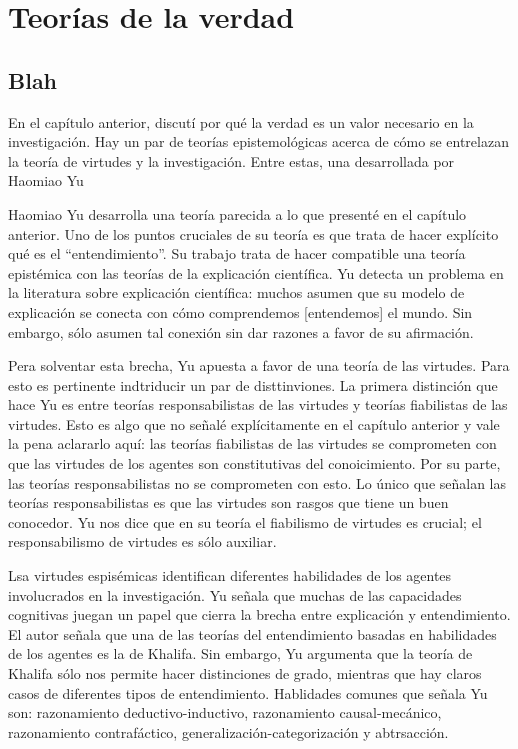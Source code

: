 

\chapter{Teorías de la verdad}
\label{ch:truththeories}

\section{Blah}

En el capítulo anterior, discutí por qué la verdad es un valor necesario en la investigación. Hay un par de teorías epistemológicas acerca de cómo se entrelazan la teoría de virtudes y la investigación. Entre estas, una desarrollada por Haomiao Yu %

Haomiao Yu desarrolla una teoría parecida a lo que presenté en el capítulo anterior. Uno de los puntos cruciales de su teoría es que trata de hacer explícito qué es el ``entendimiento''. Su trabajo trata de hacer compatible una teoría epistémica con las teorías de la explicación científica. Yu detecta un problema en la literatura sobre explicación científica: muchos asumen que su modelo de explicación se conecta con cómo comprendemos [entendemos] el mundo. Sin embargo, sólo asumen tal conexión sin dar razones a favor de su afirmación.

Pera solventar esta brecha, Yu apuesta a favor de una teoría de las virtudes. Para esto es pertinente indtriducir un par de disttinviones. La primera distinción que hace Yu es entre teorías responsabilistas de las virtudes y teorías fiabilistas de las virtudes. Esto es algo que no señalé explícitamente en el capítulo anterior y vale la pena aclararlo aquí: las teorías fiabilistas de las virtudes se comprometen con que las virtudes de los agentes son constitutivas del conoicimiento. Por su parte, las teorías responsabilistas no se comprometen con esto. Lo único que señalan las teorías responsabilistas es que las virtudes son rasgos que tiene un buen conocedor. Yu nos dice que en su teoría el fiabilismo de virtudes es crucial; el responsabilismo de virtudes es sólo auxiliar.

Lsa virtudes espisémicas identifican diferentes habilidades de los agentes involucrados en la investigación. Yu señala que muchas de las capacidades cognitivas juegan un papel que cierra la brecha entre explicación y entendimiento. El autor señala que una de las teorías del entendimiento basadas en habilidades de los agentes es la de Khalifa. Sin embargo, Yu argumenta que la teoría de Khalifa sólo nos permite hacer distinciones de grado, mientras que hay claros casos de diferentes tipos de entendimiento. Hablidades comunes que señala Yu son: razonamiento deductivo-inductivo, razonamiento causal-mecánico, razonamiento contrafáctico, generalización-categorización y abtrsacción.

